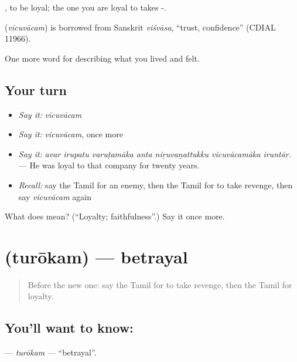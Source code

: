  , to be loyal; the one you are loyal to takes -.

\begin{cousinweb}
\textbf{} (\emph{vicuvācam}) is borrowed from Sanskrit \emph{viśvāsa}, \textquotedblleft{}trust, confidence\textquotedblright{} (CDIAL 11966).
\end{cousinweb}

\begin{grammarlens}[title={What you've built}]
One more word for describing what you lived and felt.
\end{grammarlens}

\subsection*{Your turn}
\begin{itemize}
\raggedright
  \item \emph{Say it:} \emph{vicuvācam}
  \item \emph{Say it:} \emph{vicuvācam}, once more
  \item \emph{Say it:} \emph{avar irupatu varuṭamāka anta niṟuvaṉattukku vicuvācamāka iruntār.} — He was loyal to that company for twenty years.
  \item \emph{Recall:} say the Tamil for an enemy, then the Tamil for to take revenge, then say \emph{vicuvācam} again
\end{itemize}

\begin{tcolorbox}[breakable,colback=teal!4,colframe=teal!35!black,title={Before you move on}]
What does  mean? (\textquotedblleft{}Loyalty; faithfulness\textquotedblright{}.) Say it once more.
\end{tcolorbox}
\section[\texorpdfstring{\ta{துரோகம்} (turōkam)}{துரோகம் (turōkam)}]{ (turōkam) — betrayal}

\label{lesson:TA-C470-turokam}



\begin{quote}
Before the new one: say the Tamil for to take revenge, then the Tamil for loyalty.
\end{quote}

\subsection*{You'll want to know: }
\textbf{} — \emph{turōkam} — \textquotedblleft{}betrayal\textquotedblright{}.

